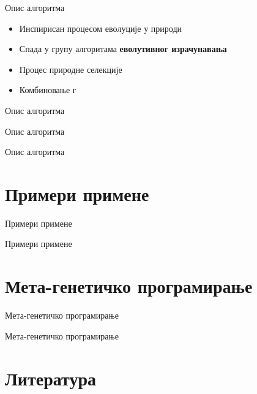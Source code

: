\documentclass{beamer}
\begin{document}
	\begin{frame}{Опис алгоритма}
		\begin{itemize}
			\item Инспирисан процесом еволуције у природи
     		\item Спада у групу алгоритама \textbf{еволутивног израчунавања}	
     		\item Процес природне селекције
     		\item Комбиновање г
		\end{itemize}
	\end{frame}

	\begin{frame}{Опис алгоритма}
	\end{frame}

	\begin{frame}{Опис алгоритма}
	\end{frame}

	\begin{frame}{Опис алгоритма}
	\end{frame}
	
\section{Примери примене}

	\begin{frame}{Примери примене}
	\end{frame}

	\begin{frame}{Примери примене}
	\end{frame}
	
\section{Мета-генетичко програмирање}

	\begin{frame}{Мета-генетичко програмирање}
	\end{frame}

	\begin{frame}{Мета-генетичко програмирање}
	\end{frame}
	
\section{Литература}
\end{document}
